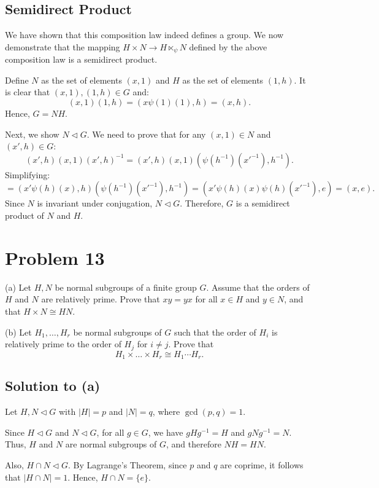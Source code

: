 \documentclass[12pt]{article}
\begin{document}
\subsection*{Semidirect Product}
We have shown that this composition law indeed defines a group. We now demonstrate that the mapping \( H \times N \to H \ltimes_\psi N \) defined by the above composition law is a semidirect product.

Define \( N \) as the set of elements \( (x, 1) \) and \( H \) as the set of elements \( (1, h) \). It is clear that \( (x, 1), (1, h) \in G \) and:
\[
(x, 1)(1, h) = (x \psi(1)(1), h) = (x, h).
\]
Hence, \( G = NH \).

Next, we show \( N \triangleleft G \). We need to prove that for any \( (x, 1) \in N \) and \( (x', h) \in G \):
\[
(x', h)(x, 1)(x', h)^{-1} = (x', h)(x, 1)(\psi(h^{-1})(x'^{-1}), h^{-1}).
\]
Simplifying:
\[
= (x' \psi(h)(x), h)(\psi(h^{-1})(x'^{-1}), h^{-1}) = (x' \psi(h)(x) \psi(h)(x'^{-1}), e) = (x, e).
\]
Since \( N \) is invariant under conjugation, \( N \triangleleft G \). Therefore, \( G \) is a semidirect product of \( N \) and \( H \).

\section*{Problem 13}
(a) Let \( H, N \) be normal subgroups of a finite group \( G \). Assume that the orders of \( H \) and \( N \) are relatively prime. Prove that \( xy = yx \) for all \( x \in H \) and \( y \in N \), and that \( H \times N \cong HN \).

(b) Let \( H_1, \ldots, H_r \) be normal subgroups of \( G \) such that the order of \( H_i \) is relatively prime to the order of \( H_j \) for \( i \neq j \). Prove that 
\[
H_1 \times \ldots \times H_r \cong H_1 \cdots H_r.
\]

\subsection*{Solution to (a)}
Let \( H, N \triangleleft G \) with \( |H| = p \) and \( |N| = q \), where \(\gcd(p, q) = 1\).

Since \( H \triangleleft G \) and \( N \triangleleft G \), for all \( g \in G \), we have \( gHg^{-1} = H \) and \( gNg^{-1} = N \). Thus, \( H \) and \( N \) are normal subgroups of \( G \), and therefore \( NH = HN \). 

Also, \( H \cap N \triangleleft G \). By Lagrange's Theorem, since \( p \) and \( q \) are coprime, it follows that \( |H \cap N| = 1 \). Hence, \( H \cap N = \{e\} \).
\end{document}
